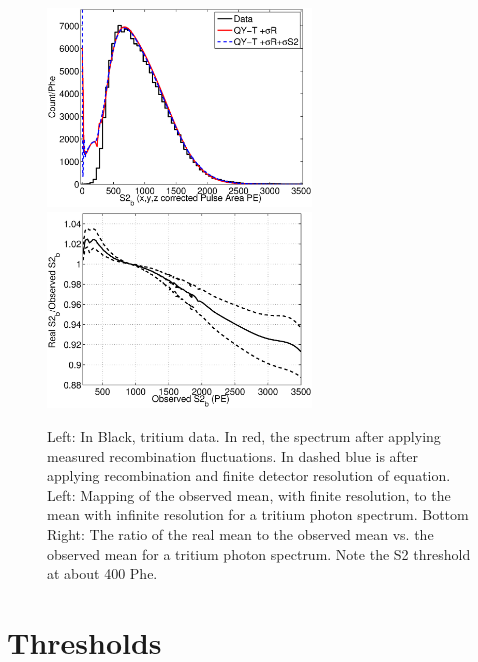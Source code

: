  \begin{figure}[h!]\centering
\includegraphics[width=70mm]{Recombination_LY_QY/Figures/S1S2_Spectra/S2_spec_iter1_.eps}
\includegraphics[width=70mm]{Recombination_LY_QY/Figures/S1S2_Spectra/S2_corr_iter1_.eps}
\caption{Left: In Black, tritium data. In red, the spectrum after applying measured recombination fluctuations. In dashed blue is after applying recombination and finite detector resolution of equation. Left: Mapping of the observed mean, with finite resolution, to the mean with infinite resolution for a tritium photon spectrum. Bottom Right: The ratio of the real mean to the observed mean vs. the observed mean for a tritium photon spectrum. Note the S2 threshold at about 400  Phe. }
\label{fig:S2_mapping_2}
\end{figure}

\newpage

\section{Thresholds}

